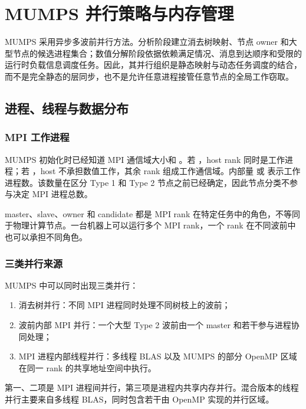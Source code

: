 \chapter{MUMPS 并行策略与内存管理}

MUMPS 采用异步多波前并行方法。分析阶段建立消去树映射、节点 owner 和大型节点的候选进程集合；数值分解阶段依据依赖满足情况、消息到达顺序和受限的运行时负载信息调度任务。因此，其并行组织是静态映射与动态任务调度的结合，而不是完全静态的层同步，也不是允许任意进程接管任意节点的全局工作窃取\cite{mumpsguide,amestoy2001,amestoy2006}。

\section{进程、线程与数据分布}

\subsection{MPI 工作进程}

MUMPS 初始化时已经知道 MPI 通信域大小和 。若 ，host rank 同时是工作进程；若 ，host 不承担数值工作，其余 rank 组成工作通信域。内部量  或  表示工作进程数。该数量在区分 Type 1 和 Type 2 节点之前已经确定，因此节点分类不参与决定 MPI 进程总数。

master、slave、owner 和 candidate 都是 MPI rank 在特定任务中的角色，不等同于物理计算节点。一台机器上可以运行多个 MPI rank，一个 rank 在不同波前中也可以承担不同角色。

\subsection{三类并行来源}

MUMPS 中可以同时出现三类并行：

\begin{enumerate}
  \item 消去树并行：不同 MPI 进程同时处理不同树枝上的波前；
  \item 波前内部 MPI 并行：一个大型 Type 2 波前由一个 master 和若干参与进程协同处理；
  \item MPI 进程内部线程并行：多线程 BLAS 以及 MUMPS 的部分 OpenMP 区域在同一 rank 的共享地址空间中执行。
\end{enumerate}

第一、二项是 MPI 进程间并行，第三项是进程内共享内存并行。混合版本的线程并行主要来自多线程 BLAS，同时包含若干由 OpenMP 实现的并行区域\cite{mumpsguide}。

